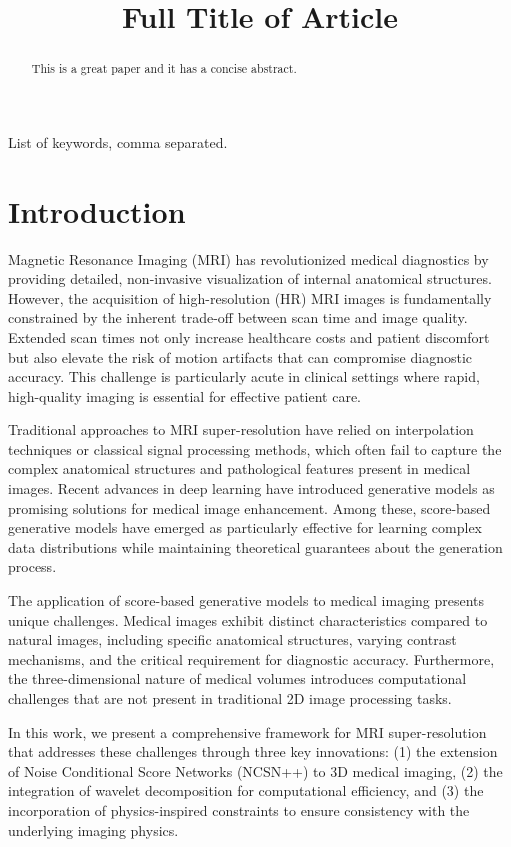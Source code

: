 \documentclass{midl} %
\title[Short Title]{Full Title of Article}
\begin{document}
\maketitle

\begin{abstract}
This is a great paper and it has a concise abstract.
\end{abstract}

\begin{keywords}
List of keywords, comma separated.
\end{keywords}

\section{Introduction}

Magnetic Resonance Imaging (MRI) has revolutionized medical diagnostics by providing detailed, non-invasive visualization of internal anatomical structures. However, the acquisition of high-resolution (HR) MRI images is fundamentally constrained by the inherent trade-off between scan time and image quality. Extended scan times not only increase healthcare costs and patient discomfort but also elevate the risk of motion artifacts that can compromise diagnostic accuracy. This challenge is particularly acute in clinical settings where rapid, high-quality imaging is essential for effective patient care.

Traditional approaches to MRI super-resolution have relied on interpolation techniques or classical signal processing methods, which often fail to capture the complex anatomical structures and pathological features present in medical images. Recent advances in deep learning have introduced generative models as promising solutions for medical image enhancement. Among these, score-based generative models have emerged as particularly effective for learning complex data distributions while maintaining theoretical guarantees about the generation process.

The application of score-based generative models to medical imaging presents unique challenges. Medical images exhibit distinct characteristics compared to natural images, including specific anatomical structures, varying contrast mechanisms, and the critical requirement for diagnostic accuracy. Furthermore, the three-dimensional nature of medical volumes introduces computational challenges that are not present in traditional 2D image processing tasks.

In this work, we present a comprehensive framework for MRI super-resolution that addresses these challenges through three key innovations: (1) the extension of Noise Conditional Score Networks (NCSN++) to 3D medical imaging, (2) the integration of wavelet decomposition for computational efficiency, and (3) the incorporation of physics-inspired constraints to ensure consistency with the underlying imaging physics.
\end{document}

